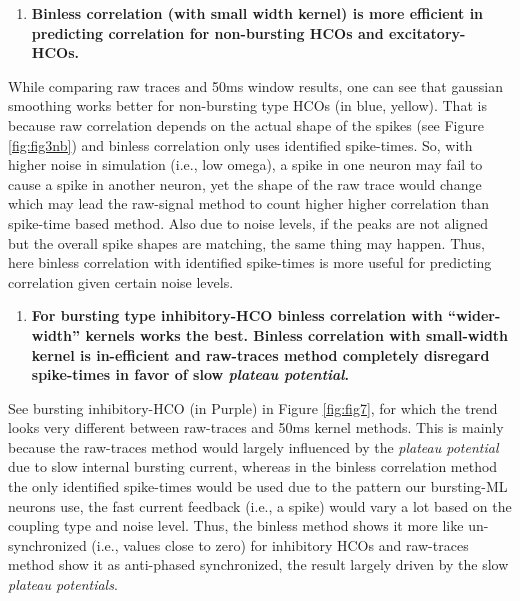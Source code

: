 \documentclass[
]{article}
\providecommand{\tightlist}{%
  \setlength{\itemsep}{0pt}\setlength{\parskip}{0pt}}
\begin{document}
\begin{enumerate}
\def\labelenumi{\arabic{enumi}.}
\setcounter{enumi}{1}
\tightlist
\item
  \textbf{Binless correlation (with small width kernel) is more efficient in predicting correlation for non-bursting HCOs and excitatory-HCOs.}
\end{enumerate}

While comparing raw traces and 50ms window results, one can see that gaussian smoothing works better for non-bursting type HCOs (in blue, yellow). That is because raw correlation depends on the actual shape of the spikes (see Figure \ref{fig:fig3nb}) and binless correlation only uses identified spike-times. So, with higher noise in simulation (i.e., low omega), a spike in one neuron may fail to cause a spike in another neuron, yet the shape of the raw trace would change which may lead the raw-signal method to count higher higher correlation than spike-time based method. Also due to noise levels, if the peaks are not aligned but the overall spike shapes are matching, the same thing may happen. Thus, here binless correlation with identified spike-times is more useful for predicting correlation given certain noise levels.

\begin{enumerate}
\def\labelenumi{\arabic{enumi}.}
\setcounter{enumi}{2}
\tightlist
\item
  \textbf{For bursting type inhibitory-HCO binless correlation with ``wider-width'' kernels works the best. Binless correlation with small-width kernel is in-efficient and raw-traces method completely disregard spike-times in favor of slow \emph{plateau potential}.}
\end{enumerate}

See bursting inhibitory-HCO (in Purple) in Figure \ref{fig:fig7}, for which the trend looks very different between raw-traces and 50ms kernel methods. This is mainly because the raw-traces method would largely influenced by the \emph{plateau potential} due to slow internal bursting current, whereas in the binless correlation method the only identified spike-times would be used due to the pattern our bursting-ML neurons use, the fast current feedback (i.e., a spike) would vary a lot based on the coupling type and noise level. Thus, the binless method shows it more like un-synchronized (i.e., values close to zero) for inhibitory HCOs and raw-traces method show it as anti-phased synchronized, the result largely driven by the slow \emph{plateau potentials}.
\end{document}
